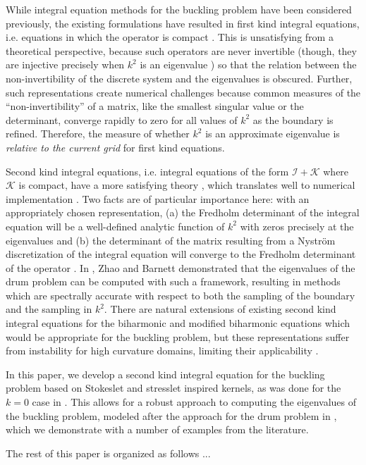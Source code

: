 While integral equation methods for the buckling problem
have been considered previously, the existing formulations
have resulted in first kind integral equations, i.e. equations
in which the operator is compact \cite{kitahara2014boundary,
  antunes2011buckling}. This is unsatisfying from a theoretical
perspective, because such operators are never invertible
(though, they are injective precisely when $k^2$ is an
eigenvalue \cite{kitahara2014boundary}) so that the
relation between the non-invertibility of the discrete system
and the eigenvalues is obscured. Further, such representations
create numerical challenges because common measures of the
``non-invertibility'' of a matrix, like the smallest singular
value or the determinant, converge rapidly to zero for all
values of $k^2$ as the boundary is refined. Therefore, the
measure of whether $k^2$ is an approximate eigenvalue is
{\em relative to the current grid} for first kind equations.

Second kind integral equations, i.e. integral equations
of the form $\mathcal{I} + \mathcal{K}$ where $\mathcal{K}$
is compact, have a more satisfying theory
\cite{reed1972methods,kress1989linear},
which translates well to numerical implementation
\cite{atkinson2009numerical,bornemann2010numerical,
  hackbusch2012integral,zhao2015robust}. Two facts are
of particular importance here: with an appropriately
chosen representation, (a) the Fredholm determinant of the
integral equation will be a well-defined analytic function
of $k^2$ with zeros precisely at the eigenvalues and (b) the 
determinant of the matrix resulting from
a Nystr\"{o}m discretization of the integral equation
will converge to the Fredholm determinant of the operator
\cite{bornemann2010numerical}.
In \cite{zhao2015robust}, Zhao and Barnett demonstrated
that the eigenvalues of the drum problem can be
computed with such a framework, resulting in
methods which are spectrally accurate with respect
to both the sampling of the boundary and the sampling
in $k^2$. There are natural extensions of existing second
kind integral
equations for the biharmonic \cite{farkas1989mathematical}
and modified biharmonic \cite{jiang2013second} equations
which would be appropriate for the buckling problem, but
these representations suffer from instability for
high curvature domains, limiting their applicability
\cite{rachh2017integral}.

In this paper, we develop a second kind integral
equation for the buckling problem based on Stokeslet
and stresslet inspired kernels, as was done for the
$k=0$ case in \cite{rachh2017integral}. This allows
for a robust approach to computing the eigenvalues
of the buckling problem, modeled after the approach for
the drum problem in \cite{zhao2015robust}, which we
demonstrate with a number of examples from the
literature.

The rest of this paper is organized as follows ...

